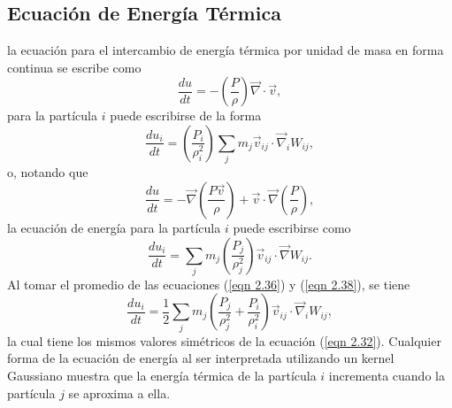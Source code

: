 \documentclass[a4paper,openright,10pt, oneside, final]{book}
\begin{document}
\subsection{Ecuación de Energía Térmica}
la ecuación para el intercambio de energía térmica por unidad de masa en forma continua se escribe como
\begin{equation}
\frac{d u}{d t}
=
-\left(\frac{P}{\rho}\right)
\vec{\nabla}\cdot\vec{v},\label{eqn 2.35}
\end{equation}
para la partícula $i$ puede escribirse de la forma
\begin{equation}
\frac{d u_{i}}{d t}
=
\left(\frac{P_{i}}{\rho_{i}^{2}}\right)
\sum_{j}m_{j}\vec{v}_{ij}\cdot\vec{\nabla}_{i}W_{ij},\label{eqn 2.36}
\end{equation}
o, notando que 
\begin{equation}
\frac{d u}{d t}
=
-\vec{\nabla}
\left(\frac{P\vec{v}}{\rho}\right)
+ 
\vec{v}\cdot\vec{\nabla}\left(\frac{P}{\rho}\right),\label{eqn 2.37}
\end{equation}
la ecuación de energía para la partícula $i$ puede escribirse como
\begin{equation}
\frac{d u_{i}}{d t}
=
\sum_{j}m_{j}\left(\frac{P_{j}}{\rho_{j}^{2}}\right)
\vec{v}_{ij}\cdot\vec{\nabla}W_{ij}.\label{eqn 2.38}
\end{equation}
Al tomar el promedio de las ecuaciones (\ref{eqn 2.36}) y (\ref{eqn 2.38}), se tiene
\begin{equation}
\frac{d u_{i}}{d t}
=
\frac{1}{2}\sum_{j}m_{j}\left(\frac{P_{j}}{\rho_{j}^{2}}
+\frac{P_{i}}{\rho_{i}^{2}}\right)
\vec{v}_{ij}\cdot\vec{\nabla}_{i}W_{ij},\label{eqn 2.39}
\end{equation}
la cual tiene los mismos valores simétricos de la ecuación (\ref{eqn 2.32}). Cualquier forma de la ecuación de energía al ser interpretada utilizando un kernel Gaussiano muestra que la energía térmica de la partícula $i$ incrementa cuando la partícula $j$ se aproxima a ella.
\end{document}
